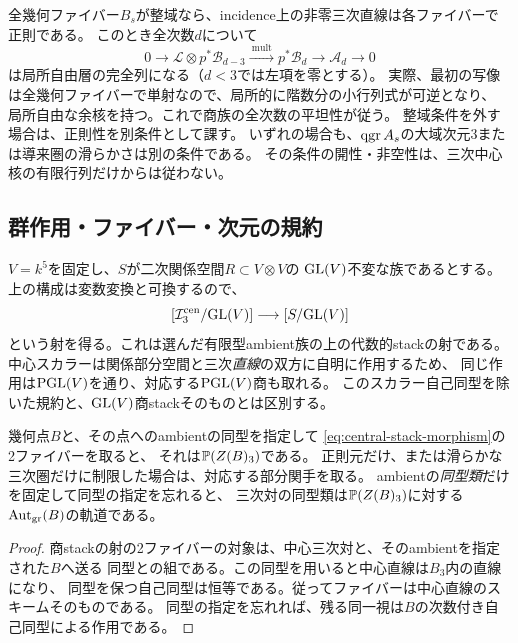 全幾何ファイバー$B_s$が整域なら、incidence上の非零三次直線は各ファイバーで正則である。
このとき全次数$d$について
\begin{equation}\label{eq:relative-cubic-flat-quotient}
 0\longrightarrow\mathcal L\otimes p^*\mathcal B_{d-3}
 \xrightarrow{\ \mathrm{mult}\ }p^*\mathcal B_d
 \longrightarrow\mathcal A_d\longrightarrow0
\end{equation}
は局所自由層の完全列になる（$d<3$では左項を零とする）。
実際、最初の写像は全幾何ファイバーで単射なので、局所的に階数分の小行列式が可逆となり、
局所自由な余核を持つ。これで商族の全次数の平坦性が従う。
整域条件を外す場合は、正則性を別条件として課す。
いずれの場合も、$\operatorname{qgr} A_s$の大域次元3または導来圏の滑らかさは別の条件である。
その条件の開性・非空性は、三次中心核の有限行列だけからは従わない。

\subsection{群作用・ファイバー・次元の規約}
$V=k^5$を固定し、$S$が二次関係空間$R\subset V\otimes V$の
$\mathrm{GL}(V)$不変な族であるとする。
上の構成は変数変換と可換するので、
\begin{equation}\label{eq:central-stack-morphism}
 [\mathcal I^{\mathrm{cen}}_3/\mathrm{GL}(V)]
 \longrightarrow[S/\mathrm{GL}(V)]
\end{equation}
という射を得る。これは選んだ有限型ambient族の上の代数的stackの射である。
中心スカラーは関係部分空間と三次\emph{直線}の双方に自明に作用するため、
同じ作用は$\mathrm{PGL}(V)$を通り、対応する$\mathrm{PGL}(V)$商も取れる。
このスカラー自己同型を除いた規約と、$\mathrm{GL}(V)$商stackそのものとは区別する。

\begin{proposition}[固定ambient上のファイバー]\label{prop:ambient-fibers-stack}
幾何点$B$と、その点へのambientの同型を指定して
\eqref{eq:central-stack-morphism}の2ファイバーを取ると、
それは$\mathbb P(Z(B)_3)$である。
正則元だけ、または滑らかな三次圏だけに制限した場合は、対応する部分関手を取る。
ambientの\emph{同型類}だけを固定して同型の指定を忘れると、
三次対の同型類は$\mathbb P(Z(B)_3)$に対する$\operatorname{Aut}_{\mathrm{gr}}(B)$の軌道である。
\end{proposition}
\begin{proof}
商stackの射の2ファイバーの対象は、中心三次対と、そのambientを指定された$B$へ送る
同型との組である。この同型を用いると中心直線は$B_3$内の直線になり、
同型を保つ自己同型は恒等である。従ってファイバーは中心直線のスキームそのものである。
同型の指定を忘れれば、残る同一視は$B$の次数付き自己同型による作用である。
\end{proof}

